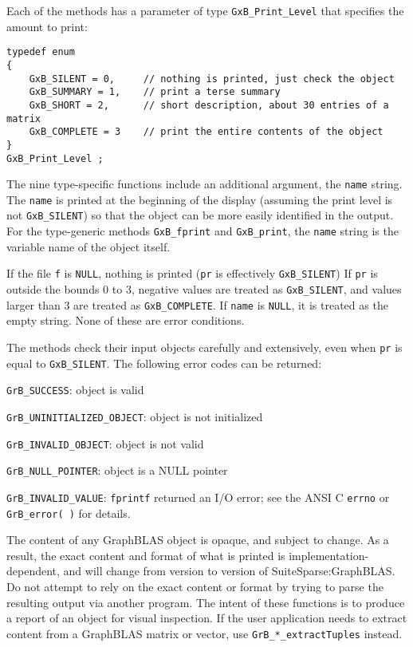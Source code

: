 \documentclass[12pt]{article}
\newenvironment{packed_itemize}{
\begin{itemize}
  \setlength{\itemsep}{1pt}
  \setlength{\parskip}{0pt}
  \setlength{\parsep}{0pt}
}{\end{itemize}}
\begin{document}
\newpage
Each of the methods has a parameter of type \verb'GxB_Print_Level' that
specifies the amount to print:

{\footnotesize
\begin{verbatim}
typedef enum
{
    GxB_SILENT = 0,     // nothing is printed, just check the object
    GxB_SUMMARY = 1,    // print a terse summary
    GxB_SHORT = 2,      // short description, about 30 entries of a matrix
    GxB_COMPLETE = 3    // print the entire contents of the object
}
GxB_Print_Level ; \end{verbatim}}

The nine type-specific functions include an additional argument, the
\verb'name' string.  The \verb'name' is printed at the beginning of the display
(assuming the print level is not \verb'GxB_SILENT') so that the object can be
more easily identified in the output.  For the type-generic methods
\verb'GxB_fprint' and \verb'GxB_print', the \verb'name' string is the variable
name of the object itself.

If the file \verb'f' is \verb'NULL', nothing is printed (\verb'pr' is
effectively \verb'GxB_SILENT') If \verb'pr' is outside the bounds 0 to 3,
negative values are treated as \verb'GxB_SILENT', and values larger than 3 are
treated as \verb'GxB_COMPLETE'.  If \verb'name' is \verb'NULL', it is treated
as the empty string.  None of these are error conditions.

The methods check their input objects carefully and extensively, even when
\verb'pr' is equal to \verb'GxB_SILENT'.  The following error codes can be
returned:

\begin{packed_itemize}
\item \verb'GrB_SUCCESS':               object is valid
\item \verb'GrB_UNINITIALIZED_OBJECT':  object is not initialized
\item \verb'GrB_INVALID_OBJECT':        object is not valid
\item \verb'GrB_NULL_POINTER':          object is a NULL pointer
\item \verb'GrB_INVALID_VALUE':         \verb'fprintf' returned an I/O error;
    see the ANSI C \verb'errno' or \verb'GrB_error( )' for details.
\end{packed_itemize}

The content of any GraphBLAS object is opaque, and subject to change.  As a
result, the exact content and format of what is printed is
implementation-dependent, and will change from version to version of
SuiteSparse:GraphBLAS.  Do not attempt to rely on the exact content or format
by trying to parse the resulting output via another program.  The intent of
these functions is to produce a report of an object for visual inspection.  If
the user application needs to extract content from a GraphBLAS matrix or
vector, use \verb'GrB_*_extractTuples' instead.
\end{document}
